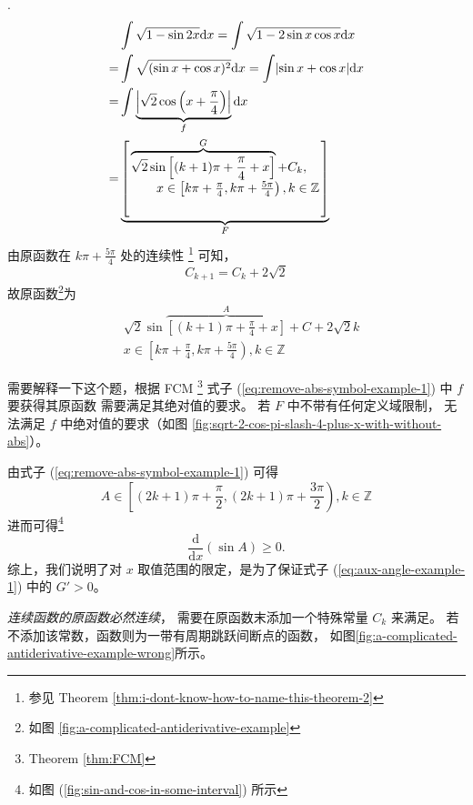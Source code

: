 \begin{example}
    \label{example:a-complicated-example-of-antiderivative-1}

    \cite[page 130]{yc}.
    \begin{align}
        \notag &\int \sqrt{1 - \sin 2x} \mathrm dx 
        \notag =\int \sqrt{1 - 2 \sin x \cos x} \mathrm dx \\
        \notag =&\int \sqrt{(\sin x + \cos x)^2} \mathrm dx 
        \notag =\int \abs*{\sin x + \cos x} \mathrm dx \\
        \label{eq:aux-angle-example-1} =&\int \underbrace{\abs*{\sqrt{2} \cos \left(x + \frac{\pi}{4}\right)}}_{f} \mathrm dx \\
        \label{eq:remove-abs-symbol-example-1} =
            & \underbrace{
                \left[
                    \splitfrac{
                        \overbrace{
                            \sqrt{2} \sin 
                            \left[(k + 1) \pi + \frac{\pi}{4} + x \right] 
                        }^{G}
                        + C_k,
                    }{
                        x \in \left[
                            k\pi + \frac{\pi}{4}, k \pi + \frac{5\pi}{4}
                        \right), k \in \mathbb Z 
                    }
                \right]
            }_{F}
    \end{align}
    由原函数在 $k\pi + \frac{5\pi}{4}$ 处的连续性
    \footnote{参见 Theorem \ref{thm:i-dont-know-how-to-name-this-theorem-2}}
    可知，
    \[
        C_{k + 1} = C_k + 2\sqrt{2}
    \]
    故原函数\footnote{如图 \ref{fig:a-complicated-antiderivative-example}}为
    \begin{align*}
        &\sqrt{2}\sin \overbrace{\left[(k+1) \pi + \frac{\pi}{4} + x\right]}^{A} + C + 2\sqrt{2} k \\
        &x\in \left[k\pi + \frac{\pi}{4}, k \pi + \frac{5\pi}{4}\right), k \in \mathbb Z 
    \end{align*}

    需要解释一下这个题，根据 FCM \footnote{Theorem \ref{thm:FCM}}
    式子 (\ref{eq:remove-abs-symbol-example-1}) 中 $f$ 要获得其原函数
    需要满足其绝对值的要求。
    若 $F$ 中不带有任何定义域限制，
    无法满足 $f$ 中绝对值的要求（如图 \ref{fig:sqrt-2-cos-pi-slash-4-plus-x-with-without-abs}）。

    由式子 (\ref{eq:remove-abs-symbol-example-1}) 可得
    \[
        A \in \left[
            (2k + 1) \pi + \frac{\pi}{2}, (2k + 1) \pi + \frac{3\pi}{2}
        \right), k \in \mathbb Z
    \]
    进而可得\footnote{如图 (\ref{fig:sin-and-cos-in-some-interval}) 所示}
    \[
        \frac{\mathrm d}{\mathrm dx}\left(\sin A\right) \geq 0.
    \]
    综上，我们说明了对 $x$ 取值范围的限定，是为了保证式子 (\ref{eq:aux-angle-example-1})
    中的 $G' > 0$。

    \emph{连续函数的原函数必然连续}，
    需要在原函数末添加一个特殊常量 $C_k$ 来满足。
    若不添加该常数，函数则为一带有周期跳跃间断点的函数，
    如图\ref{fig:a-complicated-antiderivative-example-wrong}所示。
\end{example}


